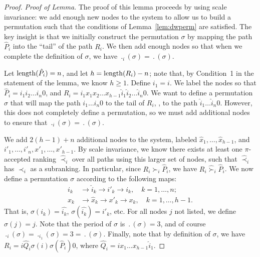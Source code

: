 \begin{proof}
{\em Proof of Lemma}.  The proof of this lemma proceeds by using scale
invariance: we add enough new nodes to the system to allow us to build
a permutation such that the conditions of Lemma~\ref{lem:dwperm} are
satisfied.  The key insight is that we initially construct the
permutation $\sigma$ by
mapping the path $\hat{P}_i$ into the ``tail'' of the path $R_i$.  We
then add enough nodes so that when we complete the definition of
$\sigma$, we have $\period_i(\sigma) = \period(\sigma)$.

Let $\operatorname{length}(\hat{P}_i) = n$, and let $h = \operatorname{length}(R_i) -
n$; note that, by Condition~1 in the statement of the lemma, we know $h
\geq 1$. 
Define $i_1 = i$.  We label the nodes so that $\hat{P}_i = i_1 i_2
\ldots i_n 0$, and $R_i = i_1 x_1 x_2 \ldots x_{h-1} \hat{i}_1
\hat{i}_2 \ldots \hat{i}_n 0$.  We want to define a permutation
$\sigma$ that will map the path $i_1
\ldots i_n 0$ to the tail of $R_i$, \ie, to the path $\hat{i}_1
\ldots \hat{i}_n 0$.  However, this does not completely define a
permutation, so we must add additional nodes to ensure that
$\period_i(\sigma) = \period(\sigma)$.

We add $2(h-1) + n$
additional nodes to the system, labeled $\hat{x}_1, \ldots,
\hat{x}_{h-1}$, and $i'_1,\ldots,i'_n,x'_1,\ldots,x'_{h-1}$.  By scale
invariance, we know there exists at least one $\pi$-accepted
ranking $\hat{\prec}_i$ over all paths using this larger
set of nodes, such that $\hat{\prec}_i$ has $\prec_i$ as a
subranking.  In particular, since $R_i \succ_i \hat{P}_i$, we have
$R_i \hat{\succ}_i \hat{P}_i$.  We now define a permutation
$\sigma$ according to the following maps:
\begin{align*}
i_k & \to \hat{i}_k \to i'_k \to i_k,\quad k = 1,\ldots,n;\\
x_k & \to \hat{x}_k \to x'_k \to x_k,\quad k = 1,\ldots,h-1.
\end{align*}
That is, $\sigma(i_k) = \hat{i_k}$, $\sigma(\hat{i_k}) = i'_k$, etc.
For all nodes $j$ not listed, we define $\sigma(j) = j$.  Note that
the period of $\sigma$ is $\period(\sigma) = 3$, and of course
$\period_i(\sigma) = \period_{i_1}(\sigma) = 3 = \period(\sigma)$.  
Finally, note that by definition of $\sigma$, we have $R_i = i \hat{Q}_i
\sigma(i) \sigma(\hat{P}_i) 0$, where $\hat{Q}_i = i x_1 \ldots
x_{h-1} \hat{i}_1$.


\end{proof}
